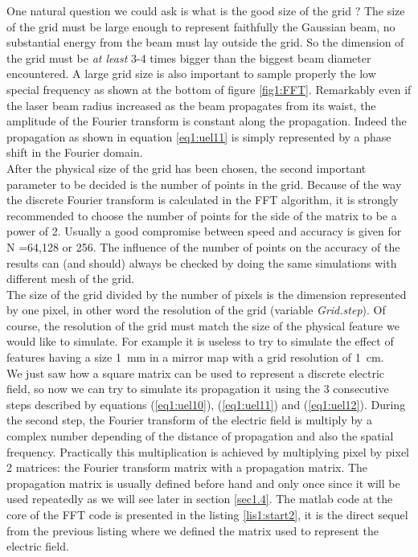 One natural question we could ask is what is the good size of the grid ? The size of the grid must be large enough to represent faithfully the Gaussian beam, no substantial energy from the beam must lay outside the grid. So the dimension of the grid must be \emph{at least} 3-4 times bigger than the biggest beam diameter encountered. A large grid size is also important to sample properly the low special frequency as shown at the bottom of figure \ref{fig1:FFT}. Remarkably even if the laser beam radius increased as the beam propagates from its waist, the amplitude of the Fourier transform is constant along the propagation. Indeed the propagation as shown in equation \ref{eq1:uel11} is simply represented by a phase shift in the Fourier domain.\\

After the physical size of the grid has been chosen, the second important parameter to be decided is the number of points in the grid. Because of the way the discrete Fourier transform is calculated in the FFT algorithm, it is strongly recommended to choose the number of points for the side of the matrix to be a power of 2. Usually a good compromise between speed and accuracy is given for N =64,128 or 256. The influence of the number of points on the accuracy of the results can (and should) always be checked by doing the same simulations with different mesh of the grid.\\

The size of the grid divided by the number of pixels is the dimension represented by one pixel, in other word the resolution of the grid (variable \emph{Grid.step}). Of course, the resolution of the grid must match the size of the physical feature we would like to simulate. For example it is useless to try to simulate the effect of features having a size 1~mm in a mirror map with a grid resolution of 1~cm.\\


We just saw how a square matrix can be used to represent a discrete electric field, so now we can try to simulate its propagation it using the 3 consecutive steps described by equations (\ref{eq1:uel10}), (\ref{eq1:uel11}) and (\ref{eq1:uel12}). During the second step, the Fourier transform of the electric field is multiply by a complex number depending of the distance of propagation and also the spatial frequency. Practically this multiplication is achieved by multiplying pixel by pixel 2 matrices: the Fourier transform matrix with a propagation matrix. The propagation matrix is usually defined before hand and only once since it will be used repeatedly as we will see later in section \ref{sec1.4}. The matlab code at the core of the FFT code is presented in the listing \ref{lis1:start2}, it is the direct sequel from the previous listing where we defined the matrix used to represent the electric field.\\

